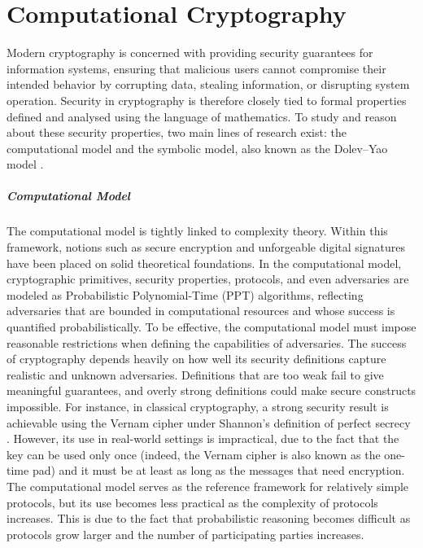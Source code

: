 \chapter{Computational Cryptography}\label{chapter:computational-cryptography}
\lhead[\fancyplain{}{\bfseries\thepage}]{\fancyplain{}{\bfseries\rightmark}}
Modern cryptography is concerned with providing security guarantees for information systems, ensuring that malicious users cannot compromise their intended behavior by corrupting data, stealing information, or disrupting system operation. Security in cryptography is therefore closely tied to formal properties defined and analysed using the language of mathematics. To study and reason about these security properties, two main lines of research exist: the computational model \cite{theory-of-computing, introduction-to-modern-cryptography} and the symbolic model, also known as the Dolev–Yao model \cite{on-the-security-of-pk-protocols}.

\paragraph{Computational Model}
The computational model is tightly linked to complexity theory. Within this framework, notions such as secure encryption and unforgeable digital signatures have been placed on solid theoretical foundations. In the computational model, cryptographic primitives, security properties, protocols, and even adversaries are modeled as Probabilistic Polynomial-Time (PPT) algorithms, reflecting adversaries that are bounded in computational resources and whose success is quantified probabilistically. To be effective, the computational model must impose reasonable restrictions when defining the capabilities of adversaries. The success of cryptography depends heavily on how well its security definitions capture realistic and unknown adversaries. Definitions that are too weak fail to give meaningful guarantees, and overly strong definitions could make secure constructs impossible. For instance, in classical cryptography, a strong security result is achievable using the Vernam cipher under Shannon’s definition of perfect secrecy \cite{shannon-communication-theory-of-secrecy-systems, joyofcryptography}. However, its use in real-world settings is impractical, due to the fact that the key can be used only once (indeed, the Vernam cipher is also known as the one-time pad) and it must be at least as long as the messages that need encryption. The computational model serves as the reference framework for relatively simple protocols, but its use becomes less practical as the complexity of protocols increases. This is due to the fact that probabilistic reasoning becomes difficult as protocols grow larger and the number of participating parties increases.

